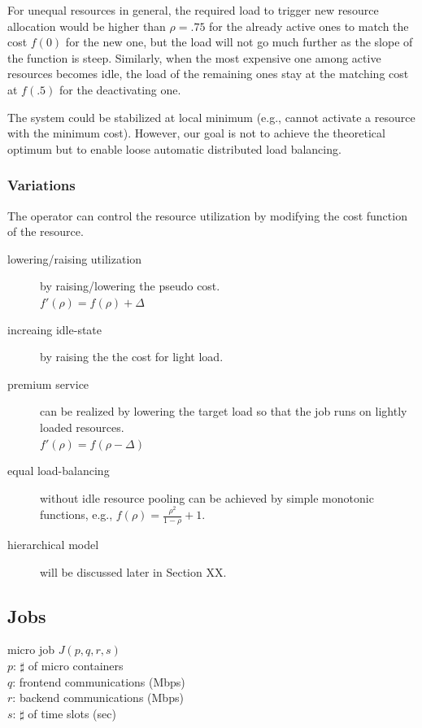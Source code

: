For unequal resources in general, the required load to trigger new
resource allocation would be higher than $\rho = .75$ for the already
active ones to match the cost $f(0)$ for the new one, but the load
will not go much further as the slope of the function is steep.
Similarly, when the most expensive one among active resources becomes
idle, the load of the remaining ones stay at the matching cost at
$f(.5)$ for the deactivating one. 

The system could be stabilized at local minimum (e.g., cannot activate
a resource with the minimum cost).
However, our goal is not to achieve the theoretical optimum but to
enable loose automatic distributed load balancing.

\subsubsection{Variations}

The operator can control the resource utilization by modifying the cost
function of the resource.

\begin{description}
\item[lowering/raising utilization] by raising/lowering the pseudo cost. \\
  $f'(\rho) = f(\rho) + \Delta$
\item[increaing idle-state] by raising the the cost for light load.
\item[premium service] can be realized by lowering the target load so
  that the job runs on lightly loaded resources. \\
  $f'(\rho) = f(\rho - \Delta)$
\item[equal load-balancing] without idle resource pooling can be
  achieved by simple monotonic functions, e.g.,
  $f(\rho) = \frac{\rho^{2}}{1 - \rho} + 1$.
\item[hierarchical model] will be discussed later in Section XX.
\end{description}

\subsection{Jobs}

micro job $J(p, q, r, s)$	\\
$p$: $\sharp$ of micro containers	\\
$q$: frontend communications (Mbps)	\\
$r$: backend communications (Mbps)	\\
$s$: $\sharp$ of time slots (sec)	\\

